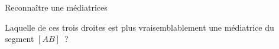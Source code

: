 \documentclass[a4paper,11pt]{report}
\begin{document}
\begin{resolu}{Reconnaître une médiatrices}{Laquelle de ces trois droites est plus vraisemblablement une médiatrice du segment $[AB]$~?

}
\end{resolu}
\end{document}
